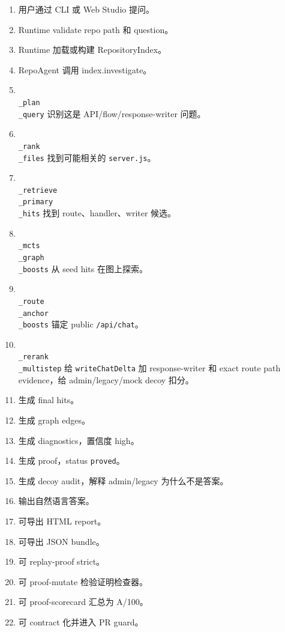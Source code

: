 \documentclass[UTF8,12pt,openany]{ctexbook}
\begin{document}
\begin{enumerate}
\item 用户通过 CLI 或 Web Studio 提问。
\item Runtime validate repo path 和 question。
\item Runtime 加载或构建 RepositoryIndex。
\item RepoAgent 调用 index.investigate。
\item \texttt{\\_plan\\_query} 识别这是 API/flow/response-writer 问题。
\item \texttt{\\_rank\\_files} 找到可能相关的 \texttt{server.js}。
\item \texttt{\\_retrieve\\_primary\\_hits} 找到 route、handler、writer 候选。
\item \texttt{\\_mcts\\_graph\\_boosts} 从 seed hits 在图上探索。
\item \texttt{\\_route\\_anchor\\_boosts} 锚定 public \texttt{/api/chat}。
\item \texttt{\\_rerank\\_multistep} 给 \texttt{writeChatDelta} 加 response-writer 和 exact route path evidence，给 admin/legacy/mock decoy 扣分。
\item 生成 final hits。
\item 生成 graph edges。
\item 生成 diagnostics，置信度 high。
\item 生成 proof，status \texttt{proved}。
\item 生成 decoy audit，解释 admin/legacy 为什么不是答案。
\item 输出自然语言答案。
\item 可导出 HTML report。
\item 可导出 JSON bundle。
\item 可 replay-proof strict。
\item 可 proof-mutate 检验证明检查器。
\item 可 proof-scorecard 汇总为 A/100。
\item 可 contract 化并进入 PR guard。
\end{enumerate}
\end{document}
